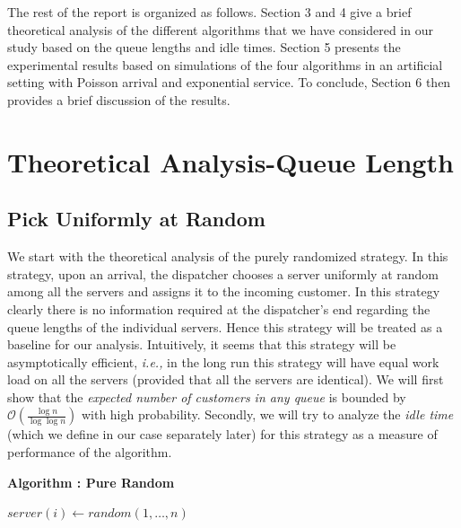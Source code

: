 \documentclass[a4paper,english,12pt]{article}
\begin{document}
\par The rest of the report is organized as follows. Section 3 and 4 give a brief theoretical analysis of the different algorithms that we have considered in our study based on the queue lengths and idle times. Section 5 presents the experimental results based on simulations of the four algorithms in an artificial setting with Poisson arrival and exponential service. To conclude, Section 6 then provides a brief discussion of the results.
\section{Theoretical Analysis-Queue Length}
\subsection{Pick Uniformly at Random}
We start with the theoretical analysis of the purely randomized strategy. In this strategy, upon an arrival, the dispatcher chooses a server uniformly at random among all the servers and assigns it to the incoming customer. In this strategy clearly there is no information required at the dispatcher's end regarding the queue lengths of the individual servers. Hence this strategy will be treated as a baseline for our analysis. Intuitively, it seems that this strategy will be asymptotically efficient, \textit{i.e.,} in the long run this strategy will have equal work load on all the servers (provided that all the servers are identical). We will first show that the \textit{expected number of customers in any queue} is bounded by $\mathcal{O}(\frac{\log n}{\log \log n})$ with high probability. Secondly, we will try to analyze the \textit{idle time} (which we define in our case separately later) for this strategy as a measure of performance of the algorithm.


\begin{algorithm}
\textbf{{Algorithm : Pure Random}}\label{euclid1}
\begin{algorithmic}[1]
\State ${server(i) \gets random(1,\ldots,n)}$
\EndFor
\State \Return 
\end{algorithmic}
\end{algorithm}
 
\end{document}
